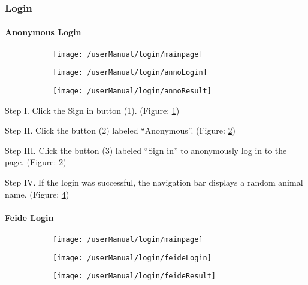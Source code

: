 \subsubsection{Login}

\paragraph{Anonymous Login}
\begin{figure}[H]
    \centering
    \begin{subfigure}{0.60\linewidth}
        \texttt{[image: /userManual/login/mainpage]}
       	\caption{}
		\label{fig:annoMainPage}	
    \end{subfigure}
    \begin{subfigure}{0.60\linewidth}
        \texttt{[image: /userManual/login/annoLogin]}
      	\caption{}
		\label{fig:annoLogin}	
    \end{subfigure}
    \begin{subfigure}{0.60\linewidth}
    	\texttt{[image: /userManual/login/annoResult]}
    	\caption{}
    	\label{fig:annoResult}	
    \end{subfigure}
\end{figure}

\begin{userManualItemlist}
	\item[Step I.] Click the Sign in button (1). (Figure: \ref{fig:annoMainPage})
	\item[Step II.] Click the button (2) labeled “Anonymous”. (Figure: \ref{fig:annoLogin})
	\item[Step III.] Click the button (3) labeled “Sign in” to anonymously log in to the page. (Figure: \ref{fig:annoLogin})
	\item[Step IV.] If the login was successful, the navigation bar displays a random animal name. (Figure: \ref{fig:annoResult})
\end{userManualItemlist}

\paragraph{Feide Login}
\begin{figure}[H]
    \centering
    \begin{subfigure}{0.60\linewidth}
        \texttt{[image: /userManual/login/mainpage]}
       	\caption{}
		\label{fig:feideMainPage}	
    \end{subfigure}
    \begin{subfigure}{0.60\linewidth}
        \texttt{[image: /userManual/login/feideLogin]}
      	\caption{}
		\label{fig:feideLogin}	
    \end{subfigure}
     \begin{subfigure}{0.60\linewidth}
        \texttt{[image: /userManual/login/feideResult]}
      	\caption{}
		\label{fig:feideResult}	
    \end{subfigure}
\end{figure}

